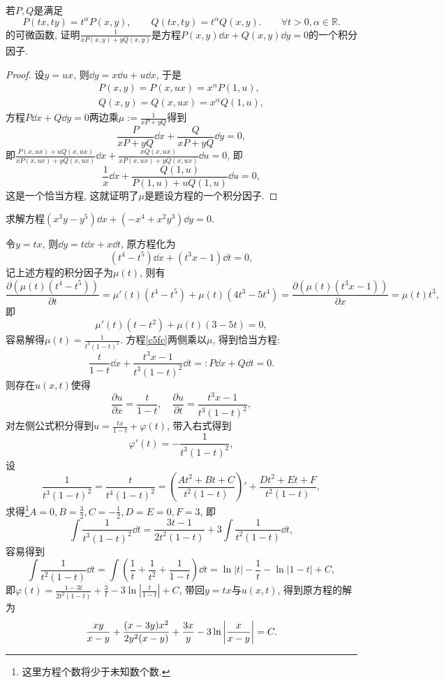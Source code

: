 \begin{quizb}
\woe 若\(P,Q\)是满足\[P(tx,ty)=t^{\alpha}P(x,y),\qquad Q(tx,ty)=t^{\alpha}Q(x,y).\qquad\forall t>0,\alpha\in\mathbb{R}.\]的可微函数, 证明\(\frac{1}{xP(x,y)+yQ(x,y)}\)是方程\(P(x,y)\dd x+Q(x,y)\dd y=0\)的一个积分因子.
\begin{proof}
设\(y=ux\), 则\(\dd y=x\dd u+u\dd x\), 于是\begin{gather*}
P(x,y)=P(x,ux)=x^{\alpha}P(1,u),\\
Q(x,y)=Q(x,ux)=x^{\alpha}Q(1,u),
\end{gather*}方程\(P\dd x+Q\dd y=0\)两边乘\(\mu:=\frac{1}{xP+yQ}\)得到\[\frac{P}{xP+yQ}\dd x+\frac{Q}{xP+yQ}\dd y=0,\]即\(\frac{P(x,ux)+uQ(x,ux)}{xP(x,ux)+yQ(x,ux)}\dd x+\frac{xQ(x,ux)}{xP(x,ux)+yQ(x,ux)}\dd u=0\), 即\[\frac{1}{x}\dd x+\frac{Q(1,u)}{P(1,u)+uQ(1,u)}\dd u=0,\]这是一个恰当方程, 这就证明了\(\mu\)是题设方程的一个积分因子.
\end{proof}
\woe 求解方程\((x^3y-y^5)\dd x+(-x^4+x^2y^3)\dd y=0.\)
\begin{solution}
令\(y=tx\), 则\(\dd y=t\dd x+x\dd t\), 原方程化为
\begin{equation}\label{c5fc}\tag{\(\clubsuit\)}
\left(t^4-t^5\right)\dd x+\left(t^3x-1\right)\dd t=0,
\end{equation}
记上述方程的积分因子为\(\mu(t)\), 则有\[\frac{\partial\left(\mu(t)\left(t^4-t^5\right)\right)}{\partial t}=\mu'(t)(t^4-t^5)+\mu(t)(4t^3-5t^4)=\frac{\partial\left(\mu (t)\left(t^3x-1\right)\right)}{\partial x}=\mu(t)t^3,\]即\[\mu'(t)(t-t^2)+\mu(t)(3-5t)=0,\]容易解得\(\mu(t)=\frac{1}{t^3(1-t)^2}\). 方程\eqref{c5fc}两侧乘以\(\mu\), 得到恰当方程:\[\frac{t}{1-t}\dd x+\frac{t^3x-1}{t^3(1-t)^2}\dd t=:P\dd x+Q\dd t=0.\]则存在\(u(x,t)\)使得\[\frac{\partial u}{\partial x}=\frac{t}{1-t},\quad \frac{\partial u}{\partial t}=\frac{t^3x-1}{t^3(1-t)^2},\]对左侧公式积分得到\(u=\frac{tx}{1-t}+\varphi(t)\), 带入右式得到\[\varphi'(t)=-\frac{1}{t^3(1-t)^2},\]设\[\frac{1}{t^3(1-t)^2}=\frac{t}{t^4(1-t)^2}=\left(\frac{At^2+Bt+C}{t^2(1-t)}\right)'+\frac{Dt^2+Et+F}{t^2(1-t)},\]求得\footnote{这里方程个数将少于未知数个数.}\(A=0,B=\frac{3}{2},C=-\frac{1}{2},D=E=0,F=3\), 即\[\int\frac{1}{t^3(1-t)^2}\dd t=\frac{3t-1}{2t^2(1-t)}+3\int\frac{1}{t^2(1-t)}\dd t,\]容易得到\[\int\frac{1}{t^2(1-t)}\dd t=\int\left(\frac{1}{t}+\frac{1}{t^2}+\frac{1}{1-t}\right)\dd t=\ln|t|-\frac{1}{t}-\ln|1-t|+C,\]即\(\varphi(t)=\frac{1-3t}{2t^2(1-t)}+\frac{3}{t}-3\ln\left|\frac{t}{1-t}\right|+C\), 带回\(y=tx\)与\(u(x,t)\), 得到原方程的解为\[\frac{xy}{x-y}+\frac{(x-3y)x^2}{2y^2(x-y)}+\frac{3x}{y}-3\ln\left|\frac{x}{x-y}\right|=C.\qedhere\]
\end{solution}
\end{quizb}